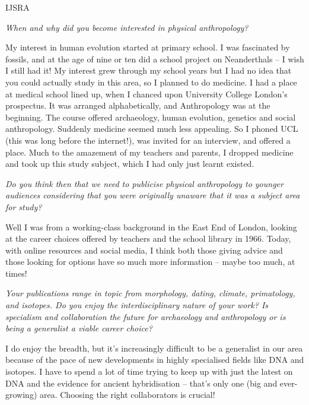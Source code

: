 \documentclass{ijsra}
\begin{document}
\begin{labeling}{IJSRA}	
\item[IJSRA (International Journal of Student Research in Archaeology)] 
\emph{When and why did you become interested in physical anthropology?}
	
\item[Prof. Chris Stringer (CS)] 
My interest in human evolution started at primary school.
I was fascinated by fossils, and at the age of nine or ten did a school project on Neanderthals – I wish I still had it!
My interest grew through my school years but I had no idea that you could actually study in this area, so I planned to do medicine.
I had a place at medical school lined up, when I chanced upon University College London’s prospectus.
It was arranged alphabetically, and Anthropology was at the beginning.
The course offered archaeology, human evolution, genetics and social anthropology.
Suddenly medicine seemed much less appealing.
So I phoned UCL (this was long before the internet!), was invited for an interview, and offered a place.
Much to the amazement of my teachers and parents, I dropped medicine and took up this study subject,
which I had only just learnt existed.

\item[IJSRA] 
\emph{Do you think then that we need to publicise physical anthropology to younger audiences considering that you were
originally unaware that it was a subject area for study?}
	
\item[CS] 
Well I was from a working-class background in the East End of London, looking at the career choices offered by
teachers and the school library in 1966. Today, with online resources and social media,
I think both those giving advice and those looking for options have so much more information – maybe too much, at times!

\item[IJSRA]
\emph{Your publications range in topic from morphology, dating, climate, primatology, and isotopes.
Do you enjoy the interdisciplinary nature of your work? 
Is specialism and collaboration the future for archaeology and anthropology or is being a generalist a viable career choice?}

\item[CS]
I do enjoy the breadth, but it’s increasingly difficult to be a generalist in our area because of
the pace of new developments in highly specialised fields like DNA and isotopes.
I have to spend a lot of time trying to keep up with just the latest on DNA and the evidence for ancient hybridisation – that’s only one (big and ever-growing) area. Choosing the right collaborators is crucial!


\end{labeling}
\end{document}
